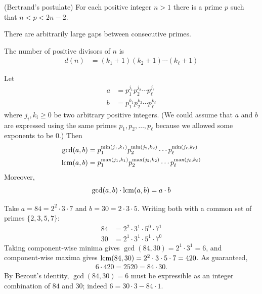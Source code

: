 \documentclass[a4paper, 12pt]{book} %
\begin{document}
\begin{theorem}
    (Bertrand's postulate) For each positive integer $n > 1$ there is a
prime $p$ such that $n < p < 2n - 2$.
\end{theorem}

\begin{theorem}
    There are arbitrarily large gaps between consecutive primes.
\end{theorem}


\begin{proposition}
    The number of positive divisors of $n$ is
    \begin{align}
        d(n) &= (k_1 + 1)(k_2 + 1) \cdots (k_\ell +1)
    \end{align}
\end{proposition}


\begin{proposition}
    Let
    \begin{align}
        a &= p_1^{j_1} p_2^{j_2} \cdots p_{\ell}^{j_\ell} \\
        b &= p_1^{k_1} p_2^{k_2} \cdots p_{\ell}^{k_\ell} 
    \end{align}
    where $j_i, k_i \geq 0$ be two arbitrary positive integers. (We could assume that $a$ and $b$ are expressed using the same primes $p_1, p_2, \ldots , p_\ell$ because we allowed some exponents to be 0.) Then
    \begin{align}
        \gcd(a, b) &= p_1^{\min(j_1, k_1)} p_2^{\min(j_2, k_2)} \cdots p_\ell^{\min(j_\ell, k_\ell)} \\
        \mathrm{lcm}(a, b) &= p_1^{\max(j_1, k_1)} p_2^{\max(j_2, k_2)} \cdots p_\ell^{\max(j_\ell, k_\ell)} \\
    \end{align}
    Moreover,
    \begin{align}
        \gcd(a, b) \cdot \mathrm{lcm}(a, b) = a \cdot b
    \end{align}
\end{proposition}

\begin{example}
    Take $a = 84 = 2^2 \cdot 3 \cdot 7$ and $b = 30 = 2 \cdot 3 \cdot 5$. Writing both with a common set of primes $\{2,3,5,7\}$:
    \begin{align}
        84 &= 2^2 \cdot 3^1 \cdot 5^0 \cdot 7^1 \\
        30 &= 2^1 \cdot 3^1 \cdot 5^1 \cdot 7^0
    \end{align}
    Taking component-wise minima gives $\gcd(84,30) = 2^1 \cdot 3^1 = 6$, and component-wise maxima gives $\mathrm{lcm}(84,30) = 2^2 \cdot 3 \cdot 5 \cdot 7 = 420$. As guaranteed,
    \begin{align}
        6 \cdot 420 = 2520 = 84 \cdot 30.
    \end{align}
    By Bezout's identity, $\gcd(84,30) = 6$ must be expressible as an integer combination of $84$ and $30$; indeed $6 = 30\cdot 3 - 84 \cdot 1$.
\end{example}
\end{document}
